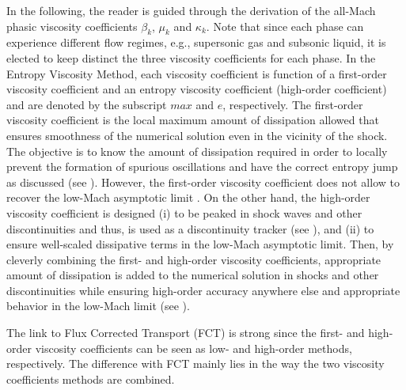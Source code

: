 \documentclass[preprint,10pt]{elsarticle}
\begin{document}
In the following, the reader is guided through the derivation of the all-Mach phasic viscosity coefficients $\beta_k$, $\mu_k$ and $\kappa_k$. Note that since each phase can experience different flow regimes, 
e.g., supersonic gas and subsonic liquid, it is elected to keep distinct the three viscosity coefficients for each phase.
In the Entropy Viscosity Method, each viscosity coefficient is function of a first-order 
viscosity coefficient and an entropy viscosity coefficient (high-order coefficient) 
and are denoted by the subscript $max$ and $e$, respectively. The first-order viscosity coefficient is the local maximum amount of dissipation allowed that ensures smoothness of the numerical solution even in the vicinity of the shock. The objective is to know the amount of dissipation required in order to locally prevent the formation of spurious oscillations and have the correct entropy jump as discussed (see ). However, the first-order viscosity coefficient does not allow to recover the low-Mach asymptotic limit \cite{Marco_paper_sem}. On the other hand, the high-order viscosity coefficient is designed (i) to be peaked in shock waves and other discontinuities and thus, is used as a discontinuity tracker (see ), and (ii) to ensure well-scaled dissipative terms in the low-Mach asymptotic limit. Then, by cleverly combining the first- and high-order viscosity coefficients, appropriate amount of dissipation is added to the numerical solution in shocks and other discontinuities while ensuring high-order accuracy anywhere else and appropriate behavior in the low-Mach limit (see ).
\\  
%
\begin{remark}
The link to Flux Corrected Transport (FCT) \cite{fct} is strong since the first- and high-order viscosity coefficients can be seen as low- and high-order methods, respectively. The difference with FCT mainly lies in the way the two viscosity coefficients methods are combined. %
\end{remark}
%
\end{document}
